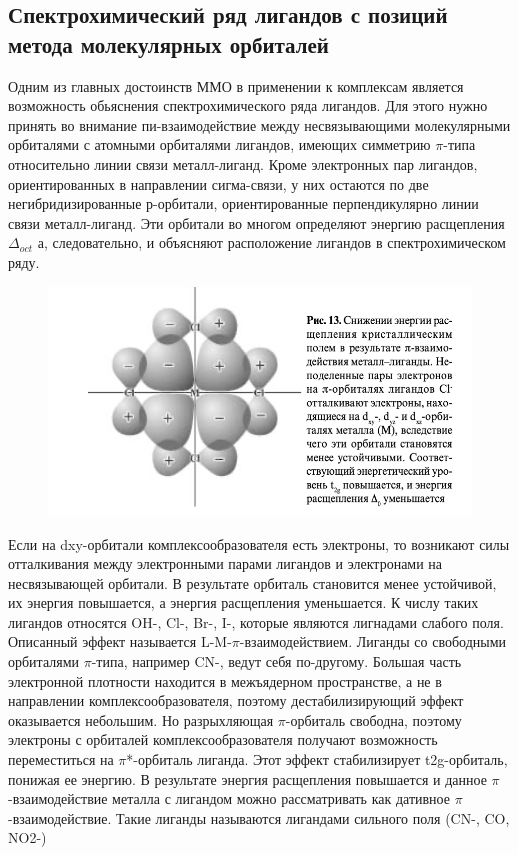 \subsection{Спектрохимический ряд лигандов с позиций метода молекулярных орбиталей}

Одним из главных достоинств ММО в применении к комплексам является возможность обьяснения спектрохимического ряда лигандов. Для этого нужно принять во внимание пи-взаимодействие между несвязывающими молекулярными орбиталями с атомными орбиталями лигандов, имеющих симметрию $\pi$-типа относительно линии связи металл-лиганд. Кроме электронных пар лигандов, ориентированных в направлении сигма-связи, у них остаются по две негибридизированные р-орбитали, ориентированные перпендикулярно линии связи металл-лиганд. Эти орбитали во многом определяют энергию расщепления $\Delta_{oct}$ а, следовательно, и объясняют расположение лигандов в спектрохимическом ряду. 
\begin{figure}[H]
\centering
\includegraphics[scale=1.00]{images/L-M-pi.png}
\end{figure}
    Если на dxy-орбитали комплексообразователя есть электроны, то возникают силы отталкивания между электронными парами лигандов и электронами на несвязывающей орбитали. В результате орбиталь становится менее устойчивой, их энергия повышается, а энергия расщепления уменьшается. К числу таких лигандов относятся OH-, Cl-, Br-, I-, которые являются лигнадами слабого поля. Описанный эффект называется L-M-$\pi$-взаимодействием. 
	Лиганды со свободными орбиталями $\pi$-типа, например CN-, ведут себя по-другому. Большая часть электронной плотности находится в межъядерном пространстве, а не в направлении комплексообразователя, поэтому дестабилизирующий эффект оказывается небольшим. Но разрыхляющая $\pi$-орбиталь свободна, поэтому электроны с орбиталей комплексообразователя получают возможность переместиться на $\pi$*-орбиталь лиганда. Этот эффект стабилизирует t2g-орбиталь, понижая ее энергию. В результате энергия расщепления повышается и данное $\pi$-взаимодействие металла с лигандом можно рассматривать как дативное $\pi$-взаимодействие. Такие лиганды называются лигандами сильного поля (CN-, CO, NO2-)

